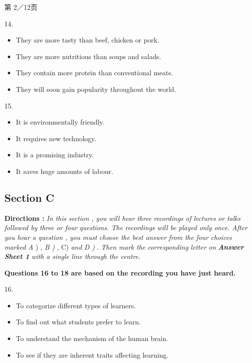 \documentclass[UTF8,11pt]{ctexart}
\begin{document}
第 2／12页


14.


\begin{itemize}[leftmargin=2em,itemsep=.2em,topsep=.4em]\item[A.] They are more tasty than beef, chicken or pork.
\item[B.] They are more nutritious than soups and salads.
\item[C.] They contain more protein than conventional meats.
\item[D.] They will soon gain popularity throughout the world.
\end{itemize}

15.


\begin{itemize}[leftmargin=2em,itemsep=.2em,topsep=.4em]\item[A.] It is environmentally friendly.
\item[C.] It requires new technology.
\end{itemize}

\begin{itemize}[leftmargin=2em,itemsep=.2em,topsep=.4em]\item[B.] It is a promising industry.
\item[D.] It saves huge amounts of labour.
\end{itemize}

\subsection*{\textbf{Section C}}


\textbf{Directions : }\textit{In this section , you will hear three recordings of lectures or talks followed by three or four} \textit{questions. The recordings will be played only once. After you hear a question , you must} \textit{choose the best answer from the four choices marked A }) , \textit{B ) }, C) \textit{and D ) }. \textit{Then mark the} \textit{corresponding letter on }\textbf{\textit{Answer Sheet 1 }}\textit{with a single line through the centre.}


\textbf{Questions 16 to 18 are based on the recording you have just heard.}


16.


\begin{itemize}[leftmargin=2em,itemsep=.2em,topsep=.4em]\item[A.] To categorize different types of learners.
\item[B.] To find out what students prefer to learn.
\item[C.] To understand the mechanism of the human brain.
\item[D.] To see if they are inherent traits affecting learning.
\end{itemize}
\end{document}

